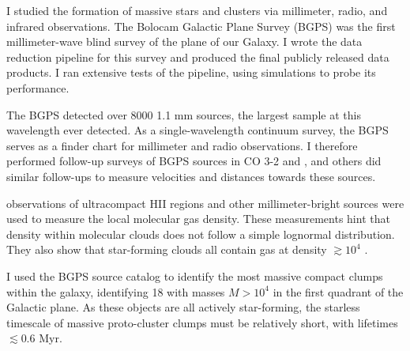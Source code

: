 {
    I studied the formation of massive stars and clusters via millimeter,
    radio, and infrared observations.  The Bolocam Galactic Plane Survey (BGPS)
    was the first millimeter-wave blind survey of the plane of our Galaxy.  I
    wrote the data reduction pipeline for this survey and produced the final
    publicly released data products.  I ran extensive tests of the pipeline,
    using simulations to probe its performance.

    The BGPS detected over 8000 1.1 mm sources, the largest sample at this
    wavelength ever detected.  As a single-wavelength continuum survey, the
    BGPS serves as a finder chart for millimeter and radio observations.  
    I therefore performed follow-up surveys of BGPS sources in CO 3-2 and
    \formaldehyde, and others did similar follow-ups to measure velocities
    and distances towards these sources.

    \formaldehyde observations of ultracompact HII regions and other
    millimeter-bright sources were used to measure the local molecular gas
    density.  These measurements hint that density within molecular clouds does
    not follow a simple lognormal distribution.  They also show that
    star-forming clouds all contain gas at density $\gtrsim10^4$ \percc.

    I used the BGPS source catalog to identify the most massive compact clumps
    within the galaxy, identifying 18 with masses $M>10^4$ \msun in the first
    quadrant of the Galactic plane.   As these objects are all actively
    star-forming, the starless timescale of massive proto-cluster clumps must
    be relatively short, with lifetimes $\lesssim0.6$ Myr.
}




